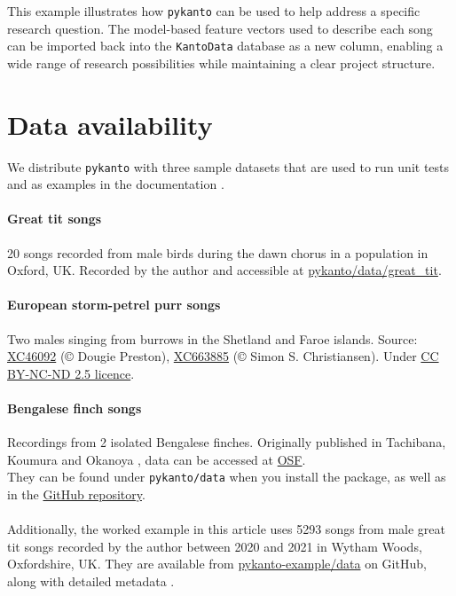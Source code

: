 This example illustrates how \texttt{pykanto} can be used to help address a
specific research question. The model-based feature vectors used to describe each song
can be imported back into the \texttt{KantoData} database as a new column, enabling a
wide range of research possibilities while maintaining a clear project
structure.

\section{Data availability}

We distribute \texttt{pykanto} with three sample datasets that are used to run unit tests
and as examples in the documentation \parencite{nilo_pykanto_2023}.

\paragraph{Great tit songs} 20 songs recorded from male birds during the dawn chorus in a
population in Oxford, UK. Recorded by the author and accessible at \href{https://github.com/nilomr/pykanto/tree/main/pykanto/data/segmented/great_tit}{pykanto/data/great\_tit}.

\paragraph{European storm-petrel purr songs} Two males singing from burrows in the Shetland
and Faroe islands. Source: \href{https://xeno-canto.org/46092}{XC46092} (©
Dougie Preston), \href{https://xeno-canto.org/663885}{XC663885} (© Simon S.
Christiansen). Under
\href{https://creativecommons.org/licenses/by-nc-nd/2.5/}{CC BY-NC-ND 2.5
licence}.

\paragraph{Bengalese finch songs} Recordings from 2 isolated Bengalese finches. Originally
published in Tachibana, Koumura and Okanoya \parencite{tachibana2015}, data can be
accessed at \href{https://osf.io/r6paq/}{OSF}.\\[.2cm]

\noindent They can be found under \texttt{pykanto/data} when you install the package, as well as in the \href{https://github.com/nilomr/pykanto}{GitHub repository}.

\paragraph{}Additionally, the worked example in this article uses 5293 songs from male great tit songs recorded by the author between 2020 and 2021 in Wytham Woods, Oxfordshire, UK. They are available from \href{https://github.com/nilomr/pykanto-example/tree/main/data/segmented/pykanto-example}{pykanto-example/data} on GitHub, along with detailed metadata \parencite{nilo_pykanto_example_2023}.

